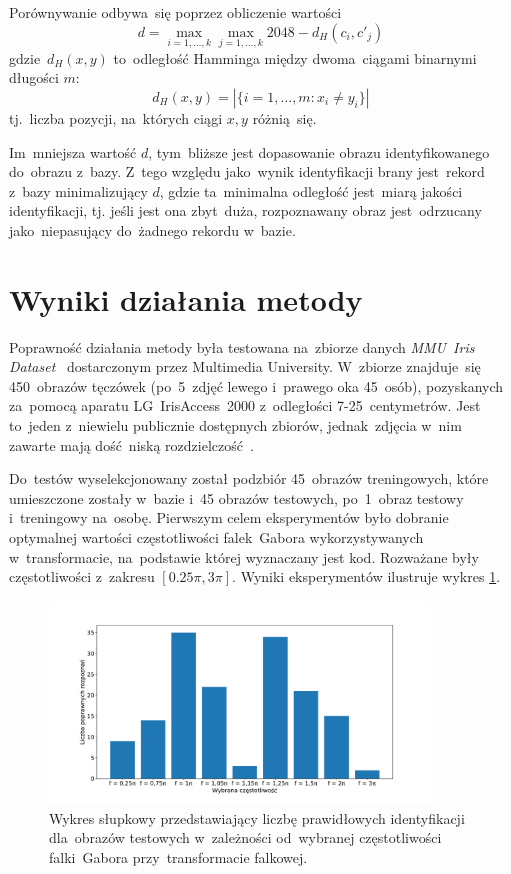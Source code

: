 \documentclass[11pt,a4paper]{article}
\begin{document}
Porównywanie odbywa~się poprzez obliczenie wartości
$$ d = \max_{i=1,\dots,k} \max_{j=1,\dots,k} 2048 - d_H(c_i, c'_j) $$
gdzie~$d_H(x, y)$ to~odległość Hamminga między dwoma~ciągami binarnymi długości $m$:
$$ d_H(x, y) = \left| \{ i=1,\dots,m : x_i \neq y_i \} \right| $$
tj.~liczba pozycji, na~których ciągi $x, y$ różnią~się.

Im~mniejsza wartość $d$, tym~bliższe jest dopasowanie obrazu identyfikowanego do~obrazu z~bazy.
Z~tego względu jako~wynik identyfikacji brany jest~rekord z~bazy minimalizujący $d$, gdzie ta~minimalna odległość jest~miarą jakości identyfikacji, tj. jeśli jest ona zbyt~duża, rozpoznawany obraz jest~odrzucany jako~niepasujący do~żadnego rekordu w~bazie.

\section{Wyniki działania metody}

Poprawność działania metody była testowana na~zbiorze danych \emph{MMU~Iris Dataset}~\cite{mmu} dostarczonym przez Multimedia University.
W~zbiorze znajduje~się 450~obrazów tęczówek (po~5~zdjęć lewego i~prawego oka 45~osób), pozyskanych za~pomocą aparatu LG~IrisAccess~2000 z~odległości 7-25~centymetrów.
Jest to~jeden z~niewielu publicznie dostępnych zbiorów, jednak~zdjęcia w~nim zawarte mają dość~niską rozdzielczość~\cite{zeng}.

Do~testów wyselekcjonowany został podzbiór 45~obrazów treningowych, które umieszczone zostały w~bazie i~45 obrazów testowych, po~1~obraz testowy i~treningowy na~osobę.
Pierwszym celem eksperymentów było dobranie optymalnej wartości częstotliwości falek~Gabora wykorzystywanych w~transformacie, na~podstawie której wyznaczany jest kod.
Rozważane były częstotliwości z~zakresu $[0.25 \pi, 3 \pi]$.
Wyniki eksperymentów ilustruje wykres \ref{fig:wavelet-frequency}.

\begin{figure}
    \centering
    \includegraphics[width=0.9\textwidth]{res/img/freq.pdf}
    \caption{
        Wykres słupkowy przedstawiający liczbę prawidłowych identyfikacji dla~obrazów testowych w~zależności od~wybranej częstotliwości falki~Gabora przy~transformacie falkowej.
    }
    \label{fig:wavelet-frequency}
\end{figure}
\end{document}
